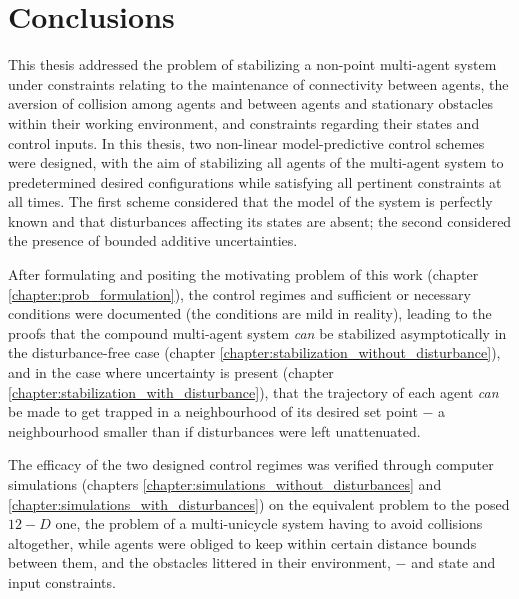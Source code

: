 \chapter{Conclusions}

This thesis addressed the problem of stabilizing a non-point multi-agent system
under constraints relating to the maintenance of connectivity between
agents, the aversion of collision among agents and between agents and
stationary obstacles within their working environment, and constraints
regarding their states and control inputs. In this thesis, two non-linear
model-predictive control schemes were designed, with the aim of stabilizing
all agents of the multi-agent system to predetermined desired configurations
while satisfying all pertinent constraints at all times. The first scheme
considered that the model of the system is perfectly known and that disturbances
affecting its states are absent; the second considered the presence of
bounded additive uncertainties.

After formulating and positing the motivating problem of this work
(chapter \ref{chapter:prob_formulation}), the control regimes and sufficient or
necessary conditions were documented (the conditions are mild in reality),
leading to the proofs that the compound multi-agent system \textit{can}
be stabilized asymptotically in the disturbance-free case
(chapter \ref{chapter:stabilization_without_disturbance}), and in the case where
uncertainty is present (chapter \ref{chapter:stabilization_with_disturbance}),
that the trajectory of each agent \textit{can} be made to get trapped in
a neighbourhood of its desired set point $-$ a neighbourhood smaller than if
disturbances were left unattenuated.

The efficacy of the two designed control regimes was verified through computer
simulations (chapters \ref{chapter:simulations_without_disturbances} and
\ref{chapter:simulations_with_disturbances}) on the equivalent problem to the
posed $12-D$ one, the problem of a multi-unicycle system having to avoid
collisions altogether, while agents were obliged to keep within certain distance
bounds between them, and the obstacles littered in their environment, $-$ and
state and input constraints.

